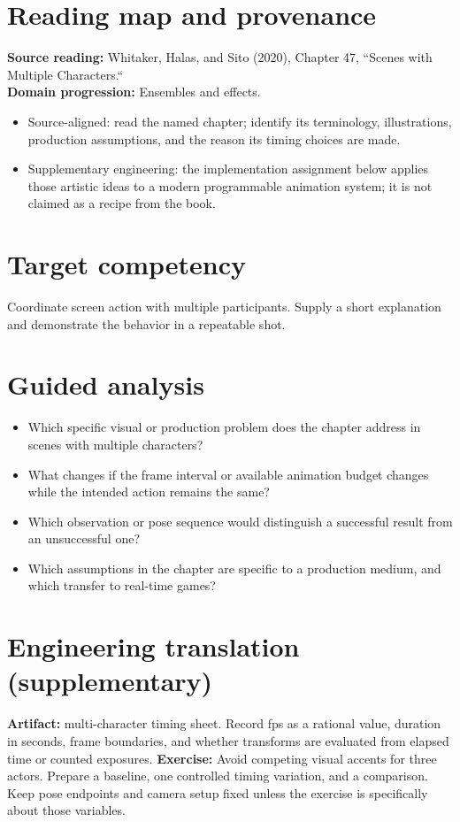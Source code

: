 \documentclass[10pt,letterpaper]{article}
\begin{document}
\makedoctitle
\makedocsummary

\section{Reading map and provenance}
\textbf{Source reading:} Whitaker, Halas, and Sito (2020), Chapter 47, ``Scenes with Multiple Characters.``\\
\textbf{Domain progression:} Ensembles and effects.
\begin{itemize}
\item Source-aligned: read the named chapter; identify its terminology, illustrations, production assumptions, and the reason its timing choices are made.
\item Supplementary engineering: the implementation assignment below applies those artistic ideas to a modern programmable animation system; it is not claimed as a recipe from the book.
\end{itemize}
\section{Target competency}
Coordinate screen action with multiple participants. Supply a short explanation and demonstrate the behavior in a repeatable shot.
\section{Guided analysis}
\begin{itemize}
\item Which specific visual or production problem does the chapter address in scenes with multiple characters?
\item What changes if the frame interval or available animation budget changes while the intended action remains the same?
\item Which observation or pose sequence would distinguish a successful result from an unsuccessful one?
\item Which assumptions in the chapter are specific to a production medium, and which transfer to real-time games?
\end{itemize}
\section{Engineering translation (supplementary)}
\textbf{Artifact:} multi-character timing sheet. Record fps as a rational value, duration in seconds, frame boundaries, and whether transforms are evaluated from elapsed time or counted exposures.
\textbf{Exercise:} Avoid competing visual accents for three actors. Prepare a baseline, one controlled timing variation, and a comparison. Keep pose endpoints and camera setup fixed unless the exercise is specifically about those variables.
\end{document}
